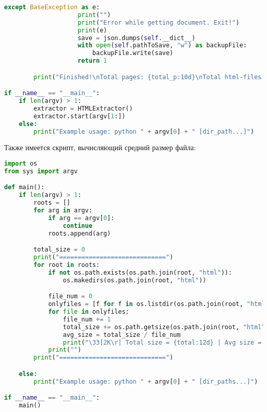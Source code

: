 \begin{lstlisting}[language=Python]
                except BaseException as e:
                    print("")
                    print("Error while getting document. Exit!")
                    print(e)
                    save = json.dumps(self.__dict__)
                    with open(self.pathToSave, "w") as backupFile:
                        backupFile.write(save)
                    return 1

        print("Finished!\nTotal pages: {total_p:10d}\nTotal html-files: {total_h:10d}\n".format(total_p=self.total_pages, total_h=self.total_html))

if __name__ == "__main__":
    if len(argv) > 1:
        extractor = HTMLExtractor()
        extractor.start(argv[1:])
    else:
        print("Example usage: python " + argv[0] + " [dir_path...]")

\end{lstlisting}

Также имеется скрипт, вычисляющий средний размер файла:
\begin{lstlisting}[language=Python]
import os
from sys import argv

def main():
    if len(argv) > 1:
        roots = []
        for arg in argv:
            if arg == argv[0]:
                continue
            roots.append(arg)

        total_size = 0
        print("=============================")
        for root in roots:
            if not os.path.exists(os.path.join(root, "html")):
                os.makedirs(os.path.join(root, "html"))

            file_num = 0
            onlyfiles = [f for f in os.listdir(os.path.join(root, "html")) if os.path.isfile(os.path.join(root, "html", f))]
            for file in onlyfiles:
                file_num += 1
                total_size += os.path.getsize(os.path.join(root, "html", file))
                avg_size = total_size / file_num
                print("\33[2K\r| Total size = {total:12d} | Avg size = {avg:6.4f} | Counting file size... {path}".format(total=total_size, avg=avg_size, path=os.path.join(root, "html", file)), end="")
            print("")
        print("=============================")

    else:
        print("Example usage: python " + argv[0] + " [dir_paths...]")

if __name__ == "__main__":
    main()
\end{lstlisting}

\pagebreak

